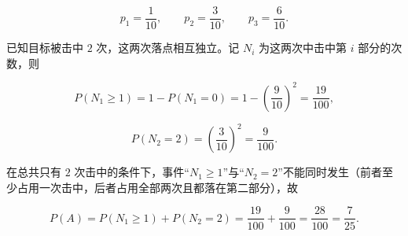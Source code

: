 \begin{answer}
\nopagebreak[4]
\[p_1=\frac1{10},\qquad p_2=\frac3{10},\qquad p_3=\frac6{10}.\]

已知目标被击中 $2$ 次，这两次落点相互独立。记 $N_i$ 为这两次中击中第 $i$ 部分的次数，则

\nopagebreak[4]
\[P(N_1\geqslant1)=1-P(N_1=0)
=1-\left(\frac9{10}\right)^2
=\frac{19}{100},\]

\nopagebreak[4]
\[P(N_2=2)=\left(\frac3{10}\right)^2=\frac9{100}.\]

在总共只有 $2$ 次击中的条件下，事件“$N_1\geqslant1$”与“$N_2=2$”不能同时发生（前者至少占用一次击中，后者占用全部两次且都落在第二部分），故

\nopagebreak[4]
\[P(A)=P(N_1\geqslant1)+P(N_2=2)
=\frac{19}{100}+\frac9{100}
=\frac{28}{100}
=\frac7{25}.\]


\end{answer}
